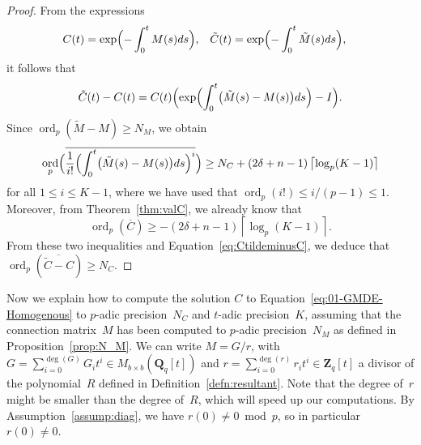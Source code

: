 \documentclass[a4paper,11pt]{article}
\numberwithin{equation}{section}
\providecommand{\ceil}[1]{\left\lceil#1\right\rceil}   %
\newcommand{\ZZ}{\mathbf{Z}} %
\newcommand{\QQ}{\mathbf{Q}} %
\DeclareMathOperator{\ord}{ord}          %
\theoremstyle{definition}
\begin{document}
\begin{proof}
From the expressions
\begin{align*}
C(t)&=\exp\Bigl(- \int_{0}^t M(s) ds\Bigr), &
\tilde{C}(t)&=\exp\Bigl(-\int_{0}^t \tilde{M}(s) ds\Bigr),
\end{align*}
it follows that
\begin{equation} \label{eq:CtildeminusC}
\tilde{C}(t) - C(t) = C(t) \Bigl( \exp \Bigl( \int_{0}^t \bigl( \tilde{M}(s)-M(s) \bigr) ds \Bigr)- I \Bigr).
\end{equation}
Since $\ord_p(\tilde{M}-M) \geq N_M$, we obtain
\begin{equation*}
\ord_p \Bigl( \overline{\frac{1}{i!} \Bigl(\int_{0}^t \bigl( \tilde{M}(s)-M(s) \bigr) ds \Bigr)^i } \Bigr) \geq 
N_C + (2 \delta + n-1) \ceil{\log_p(K-1)}
\end{equation*}
for all $1 \leq i \leq K-1$, where we have used that 
$\ord_p(i!) \leq i/(p-1) \leq 1$. Moreover, from 
Theorem~\ref{thm:valC}, we already know that 
\[
\ord_p(\overline{C}) \geq -(2 \delta + n-1) \ceil{\log_p(K-1)}.
\] 
From these two inequalities and Equation~\eqref{eq:CtildeminusC}, we 
deduce that $\ord_p(\overline{\tilde{C}-C}) \geq N_C$.
\end{proof}

Now we explain how to compute the solution $C$ to 
Equation~\eqref{eq:01-GMDE-Homogenous} to $p$-adic precision~$N_C$ and 
$t$-adic precision~$K$, assuming that the connection matrix~$M$ has been 
computed to $p$-adic precision~$N_M$ as defined in Proposition~\ref{prop:N_M}. 
We can write $M = G/r$, with 
$G = \sum_{i=0}^{\deg(G)} G_i t^i \in M_{b \times b}(\QQ_q[t])$ 
and $r = \sum_{i=0}^{\deg(r)} r_i t^i \in \ZZ_q[t]$ a divisor of the 
polynomial~$R$ defined in Definition~\ref{defn:resultant}. 
Note that the degree of~$r$ might be smaller than the degree 
of~$R$, which will speed up our computations. By Assumption~\ref{assump:diag}, 
we have $r(0) \neq 0 \bmod{p}$, so in particular $r(0) \neq 0$.  
\end{document}
